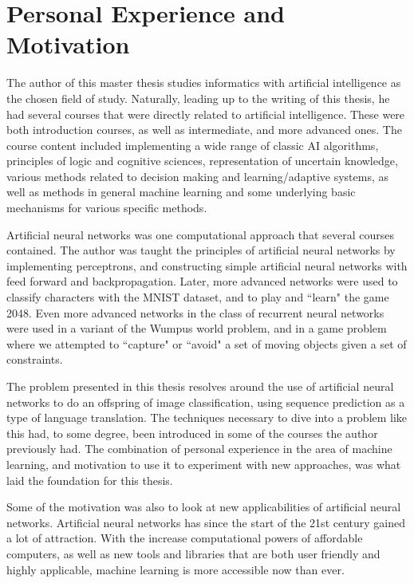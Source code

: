 
\section{Personal Experience and Motivation}
The author of this master thesis studies informatics with artificial intelligence as the chosen field of study. Naturally, leading up to the writing of this thesis, he had several courses that were directly related to artificial intelligence. These were both introduction courses, as well as intermediate, and more advanced ones. The course content included implementing a wide range of classic AI algorithms, principles of logic and cognitive sciences, representation of uncertain knowledge, various methods related to decision making and learning/adaptive systems, as well as methods in general machine learning and some underlying basic mechanisms for various specific methods. 

Artificial neural networks was one computational approach that several courses contained. The author was taught the principles of artificial neural networks by implementing perceptrons, and constructing simple artificial neural networks with feed forward and backpropagation. Later, more advanced networks were used to classify characters with the MNIST dataset, and to play and ``learn" the game 2048. Even more advanced networks in the class of recurrent neural networks were used in a variant of the Wumpus world problem, and in a game problem where we attempted to ``capture" or ``avoid" a set of moving objects given a set of constraints.

The problem presented in this thesis resolves around the use of artificial neural networks to do an offspring of image classification, using sequence prediction as a type of language translation. The techniques necessary to dive into a problem like this had, to some degree, been introduced in some of the courses the author previously had. The combination of personal experience in the area of machine learning, and motivation to use it to experiment with new approaches, was what laid the foundation for this thesis.

Some of the motivation was also to look at new applicabilities of artificial neural networks. Artificial neural networks has since the start of the 21st century gained a lot of attraction. With the increase computational powers of affordable computers, as well as new tools and libraries that are both user friendly and highly applicable, machine learning is more accessible now than ever. 

